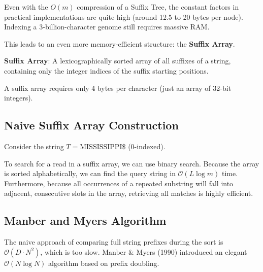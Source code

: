 Even with the $O(m)$ compression of a Suffix Tree, the constant factors in practical implementations are quite high (around 12.5 to 20 bytes per node). Indexing a 3-billion-character genome still requires massive RAM.

This leads to an even more memory-efficient structure: the \textbf{Suffix Array}.

\begin{important}
    \textbf{Suffix Array}: A lexicographically sorted array of all suffixes of a string, containing only the integer indices of the suffix starting positions.
\end{important}

A suffix array requires only 4 bytes per character (just an array of 32-bit integers). 

\subsection{Naive Suffix Array Construction}

Consider the string $T = \text{MISSISSIPPI\$}$ (0-indexed).

To search for a read in a suffix array, we can use binary search. Because the array is sorted alphabetically, we can find the query string in $(L \log m)$ time. Furthermore, because all occurrences of a repeated substring will fall into adjacent, consecutive slots in the array, retrieving all matches is highly efficient.

\subsection{Manber and Myers Algorithm}

The naive approach of comparing full string prefixes during the sort is $(D \cdot N^2)$, which is too slow. Manber \& Myers (1990) introduced an elegant $(N \log N)$ algorithm based on prefix doubling.

